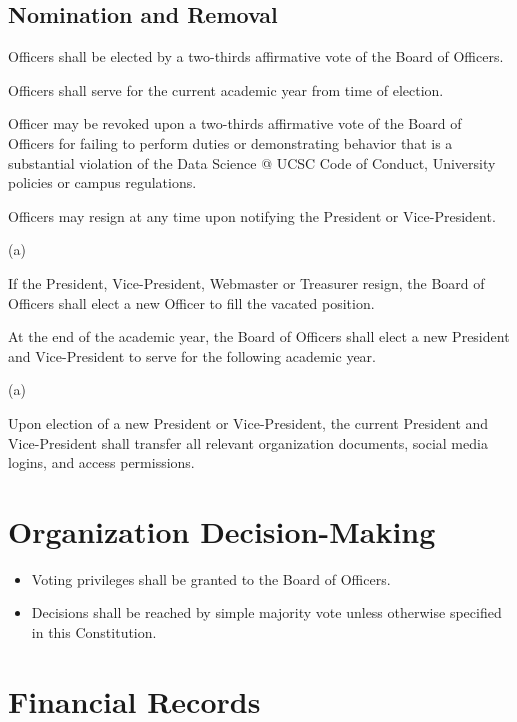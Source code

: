 \documentclass{article}
\newcommand{\SubItem}[1]{
    {\setlength\itemindent{15pt} \item[] #1}
}
\begin{document}
\subsection{Nomination and Removal}
\begin{itemize}
    \item[1.] Officers shall be elected by a two-thirds affirmative vote of the 
    Board of Officers.
    \item[2.] Officers shall serve for the current academic year from time of election.
    \item[3.] Officer may be revoked upon a two-thirds affirmative vote of the Board of 
    Officers for failing to perform duties or demonstrating behavior 
    that is a substantial violation of the Data Science @ UCSC Code of Conduct,
     University policies or campus regulations.
    \item[4.] Officers may resign at any time upon notifying the President or Vice-President.
        \SubItem{(a)} If the President, Vice-President, Webmaster or Treasurer resign, the Board of Officers shall elect a new Officer to fill the vacated position.  
    \item[] %
    \item[5.] At the end of the academic year, the Board of Officers shall elect a new 
    President and Vice-President to serve for the following academic year. 
        \SubItem{(a)}  Upon election of a new President or Vice-President, the current 
        President and Vice-President shall transfer all relevant organization documents, 
        social media logins, and access permissions. 
\end{itemize}

\section{Organization Decision-Making}
\begin{itemize}
    \item[1.] Voting privileges shall be granted to the Board of Officers.
    \item[2.] Decisions shall be reached by simple majority vote unless otherwise specified 
    in this Constitution.    
\end{itemize}


\section{Financial Records}
\end{document}
